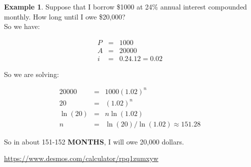 \documentclass[10pt]{article}
\theoremstyle{definition}
\newtheorem{example}[equation]{Example}
\begin{document}
\begin{example}
Suppose that I borrow \$1000 at 24\% annual interest compounded monthly.  How long until I owe \$20,000?\\

So we have:

\begin{eqnarray*}
P&=&1000\\
A&=&20000\\
i&=&0.24.12=0.02
\end{eqnarray*}

So we are solving:

\begin{eqnarray*}
20000&=&1000(1.02)^n\\
20&=&(1.02)^n\\
\ln(20)&=&n\ln(1.02)\\
n&=&\ln(20)/\ln(1.02)\approx151.28
\end{eqnarray*}

So in about 151-152 {\bf MONTHS}, I will owe 20,000 dollars.

\url{https://www.desmos.com/calculator/rpq1zumxyw}



\end{example}
\end{document}
